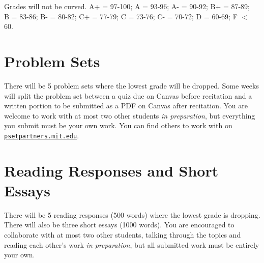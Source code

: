 \documentclass[letterpaper]{infinity_syllabus} %
\begin{document}
\begin{twentyshort}
\end{twentyshort}

Grades will not be curved.
A+ = 97-100; A = 93-96; A- = 90-92; B+ = 87-89;\\ 
B = 83-86; B- = 80-82; C+ = 77-79; C = 73-76; C- = 70-72; D = 60-69; F $<$ 60.


\vspace{0.5cm}
\section{Problem Sets}

There will be 5 problem sets where the lowest grade will be dropped.
Some weeks will split the problem set between a quiz due on Canvas before recitation and a written portion to be submitted as a PDF on Canvas after recitation.
You are welcome to work with at most two other students \textit{in preparation}, but everything you submit must be your own work.
You can find others to work with on \href{psetpartners.mit.edu}{\texttt{psetpartners.mit.edu}}.

\vspace{0.5cm}
\section{Reading Responses and Short Essays}

There will be 5 reading responses (500 words) where the lowest grade is dropping. 
There will also be three short essays (1000 words).
You are encouraged to collaborate with at most two other students, talking through the topics and reading each other's work \textit{in preparation}, but all submitted work must be entirely your own.
\end{document}
